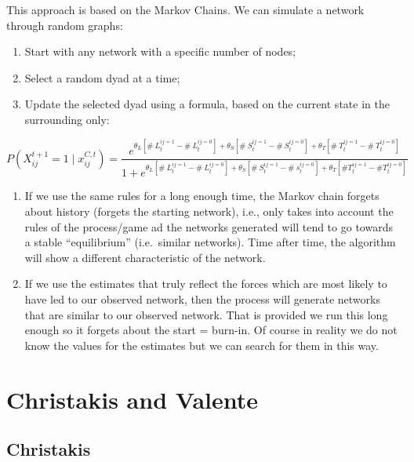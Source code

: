 \documentclass[
  notitlepage,
  onecolumn,
  openany]{book}
\providecommand{\tightlist}{%
  \setlength{\itemsep}{0pt}\setlength{\parskip}{0pt}}
\begin{document}
This approach is based on the Markov Chains. We can simulate a network through random graphs:

\begin{enumerate}
\def\labelenumi{\arabic{enumi}.}
\tightlist
\item
  Start with any network with a specific number of nodes;
\item
  Select a random dyad at a time;
\item
  Update the selected dyad using a formula, based on the current state in the surrounding only:
\end{enumerate}

\[
P\left(X_{ij}^{t+1}=1 \mid x_{ij}^{C, t}\right)= \frac{e^{\theta_{L}\left[\# ~L_{t}^{ij=1}-\# ~L_{t}^{ij=0}\right]+\theta_{S}\left[\# ~S_{t}^{ij=1}-\# ~S_{t}^{ij=0}\right]+\theta_{T}\left[\# ~T_{t}^{ij=1}-\# {~T}_{t}^{ij=0}\right]}}{1+e^{\theta_{L}\left[\# ~L_{t}^{ij=1}-\# ~L_{t}^{ij=0}\right]+\theta_{S}\left[\# ~S_{t}^{ij=1}-\# ~s_{t}^{ij=0}\right]+\theta_{T} \left[\# T_{t}^{ij=1}-\# T_{t}^{ij=0}\right]}}
\]

\begin{enumerate}
\def\labelenumi{\arabic{enumi}.}
\setcounter{enumi}{3}
\tightlist
\item
  If we use the same rules for a long enough time, the Markov chain forgets about history
  (forgets the starting network), i.e., only takes into account the rules of the process/game ad the networks generated will tend to go towards a stable ``equilibrium'' (i.e.~similar networks). Time after time, the algorithm will show a different characteristic of the network.
\item
  If we use the estimates that truly reflect the forces which are most likely to have led to our observed network, then the process will generate networks that are similar to our observed
  network. That is provided we run this long enough so it forgets about the start = burn-in. Of course in reality we do not know the values for the estimates but we can search for them in this way.
\end{enumerate}

\hypertarget{christakis-and-valente}{%
\chapter{Christakis and Valente}\label{christakis-and-valente}}

\hypertarget{christakis}{%
\section{Christakis}\label{christakis}}
\end{document}
